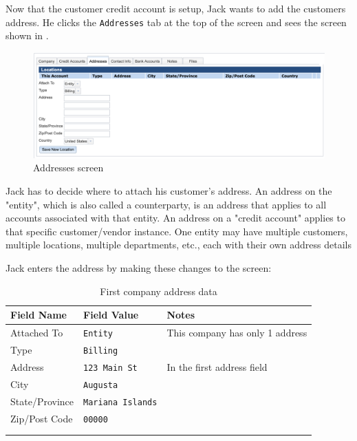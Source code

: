 Now that the customer credit account is setup, Jack wants to add the customers address. He clicks the \texttt{Addresses} tab at the top of the screen and sees the screen shown in .

\begin{figure}[H]
    \centering
    \includegraphics[width=\linewidth]{images/contact-addresses.png}
    \caption{Addresses screen}
    \label{fig:contacts-addresses-screen}
\end{figure}

Jack has to decide where to attach his customer's address. An address on the "entity", which is also called a \gls{counterparty}, is an address that applies to all accounts associated with that entity. An address on a "credit account" applies to that specific customer/vendor instance. One entity may have multiple customers, multiple locations, multiple departments, etc., each with their own address details

Jack enters the address by making these changes to the screen:

\begin{longtable}{ llp{6cm} }
       Field Name & Field Value & Notes \\ \hline
        \endhead
        Attached To & \texttt{Entity} & This company has only 1 address\\
        Type & \texttt{Billing} & \\
        Address & \texttt{123 Main St} & In the first address field\\
        City & \texttt{Augusta} &\\
        State/Province & \texttt{Mariana Islands} & \\
        Zip/Post Code & \texttt{00000} & \\
        & & \\
    \caption{First company address data}
    \label{fig:ramping-company-address-data}
\end{longtable}

